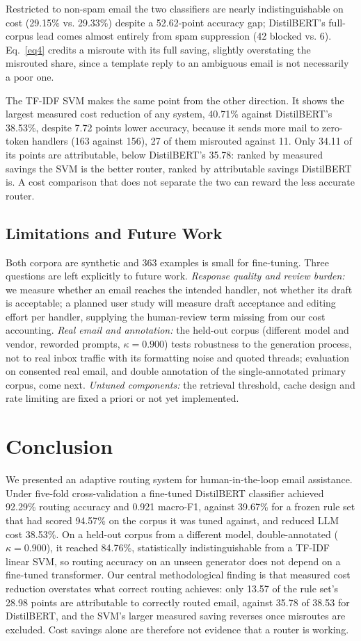 \documentclass[conference]{IEEEtran}
\begin{document}
Restricted to non-spam email the two classifiers are nearly indistinguishable on cost (29.15\% vs. 29.33\%) despite a 52.62-point accuracy gap; DistilBERT's full-corpus lead comes almost entirely from spam suppression (42 blocked vs. 6). Eq.~\eqref{eq4} credits a misroute with its full saving, slightly overstating the misrouted share, since a template reply to an ambiguous email is not necessarily a poor one.

The TF-IDF SVM makes the same point from the other direction. It shows the largest measured cost reduction of any system, 40.71\% against DistilBERT's 38.53\%, despite 7.72 points lower accuracy, because it sends more mail to zero-token handlers (163 against 156), 27 of them misrouted against 11. Only 34.11 of its points are attributable, below DistilBERT's 35.78: ranked by measured savings the SVM is the better router, ranked by attributable savings DistilBERT is. A cost comparison that does not separate the two can reward the less accurate router.

\subsection{Limitations and Future Work}
Both corpora are synthetic and 363 examples is small for fine-tuning. Three questions are left explicitly to future work. \emph{Response quality and review burden:} we measure whether an email reaches the intended handler, not whether its draft is acceptable; a planned user study will measure draft acceptance and editing effort per handler, supplying the human-review term missing from our cost accounting. \emph{Real email and annotation:} the held-out corpus (different model and vendor, reworded prompts, $\kappa = 0.900$) tests robustness to the generation process, not to real inbox traffic with its formatting noise and quoted threads; evaluation on consented real email, and double annotation of the single-annotated primary corpus, come next. \emph{Untuned components:} the retrieval threshold, cache design and rate limiting are fixed a priori or not yet implemented.

\section{Conclusion}
We presented an adaptive routing system for human-in-the-loop email assistance. Under five-fold cross-validation a fine-tuned DistilBERT classifier achieved 92.29\% routing accuracy and 0.921 macro-F1, against 39.67\% for a frozen rule set that had scored 94.57\% on the corpus it was tuned against, and reduced LLM cost 38.53\%. On a held-out corpus from a different model, double-annotated ($\kappa = 0.900$), it reached 84.76\%, statistically indistinguishable from a TF-IDF linear SVM, so routing accuracy on an unseen generator does not depend on a fine-tuned transformer. Our central methodological finding is that measured cost reduction overstates what correct routing achieves: only 13.57 of the rule set's 28.98 points are attributable to correctly routed email, against 35.78 of 38.53 for DistilBERT, and the SVM's larger measured saving reverses once misroutes are excluded. Cost savings alone are therefore not evidence that a router is working.
\end{document}
